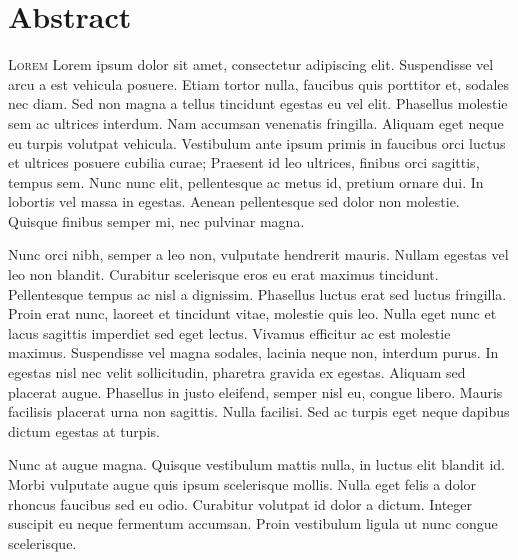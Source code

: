 \clearpage
{}
{}
\chapter*{Abstract}
\lettrine[lines=2]{L}{orem}
 Lorem ipsum dolor sit amet, consectetur adipiscing elit. Suspendisse vel arcu a est vehicula posuere. Etiam tortor nulla, faucibus quis porttitor et, sodales nec diam. Sed non magna a tellus tincidunt egestas eu vel elit. Phasellus molestie sem ac ultrices interdum. Nam accumsan venenatis fringilla. Aliquam eget neque eu turpis volutpat vehicula. Vestibulum ante ipsum primis in faucibus orci luctus et ultrices posuere cubilia curae; Praesent id leo ultrices, finibus orci sagittis, tempus sem. Nunc nunc elit, pellentesque ac metus id, pretium ornare dui. In lobortis vel massa in egestas. Aenean pellentesque sed dolor non molestie. Quisque finibus semper mi, nec pulvinar magna.

Nunc orci nibh, semper a leo non, vulputate hendrerit mauris. Nullam egestas vel leo non blandit. Curabitur scelerisque eros eu erat maximus tincidunt. Pellentesque tempus ac nisl a dignissim. Phasellus luctus erat sed luctus fringilla. Proin erat nunc, laoreet et tincidunt vitae, molestie quis leo. Nulla eget nunc et lacus sagittis imperdiet sed eget lectus. Vivamus efficitur ac est molestie maximus. Suspendisse vel magna sodales, lacinia neque non, interdum purus. In egestas nisl nec velit sollicitudin, pharetra gravida ex egestas. Aliquam sed placerat augue. Phasellus in justo eleifend, semper nisl eu, congue libero. Mauris facilisis placerat urna non sagittis. Nulla facilisi. Sed ac turpis eget neque dapibus dictum egestas at turpis.

Nunc at augue magna. Quisque vestibulum mattis nulla, in luctus elit blandit id. Morbi vulputate augue quis ipsum scelerisque mollis. Nulla eget felis a dolor rhoncus faucibus sed eu odio. Curabitur volutpat id dolor a dictum. Integer suscipit eu neque fermentum accumsan. Proin vestibulum ligula ut nunc congue scelerisque.

\clearpage
{}
{}
